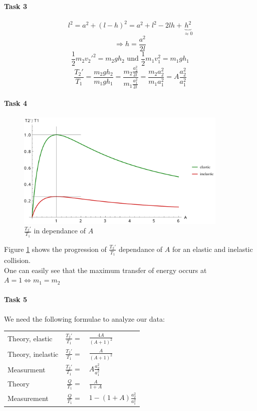 \documentclass{scrreprt}
\begin{document}
\paragraph*{Task 3}
\begin{equation}
l^2=a^2+(l-h)^2=a^2+l^2-2lh+\underbrace{h^2}_{\approx 0}
\end{equation}
\begin{equation}
\Rightarrow h=\frac{a^2}{2l}
\end{equation}
\begin{equation}
\frac{1}{2}m_2v_2'^2=m_2gh_2 \mbox{ und } \frac{1}{2}m_1v_1^2=m_1gh_1
\end{equation}
\begin{equation}
\frac{T_2'}{T_1}=\frac{m_2gh_2}{m_1gh_1}=\frac{m_2\frac{a_2^2}{2l}}{m_1\frac{a_1^2}{2l}}=\frac{m_2a_2^2}{m_1a_1^2}=A\frac{a_2^2}{a_1^2}
\end{equation}

\paragraph*{Task 4}
\begin{figure}[H]
	\centering
  \includegraphics[width=0.9\textwidth]{diag/collision.pdf}
	\caption{$\frac{T_2'}{T_1}$ in dependance of $A$}
	\label{fig:task4}
\end{figure}
\noindent Figure \ref{fig:task4} shows the progression of $\frac{T_2'}{T_1}$ dependance of $A$ for an elastic and inelastic collision.\\
One can easily see that the maximum transfer of energy occurs at $A=1\Leftrightarrow m_1=m_2$

\paragraph*{Task 5}
We need the following formulae to analyze our data:
\begin{center}
\begin{tabular}{lrl}
Theory, elastic & $\frac{T_2'}{T_1} = $ &  $\frac{4A}{(A+1)^2}$ \\
Theory, inelastic &$\frac{T_2'}{T_1} =$ &  $\frac{A}{(A+1)^2}$ \\
Measurment & $\frac{T_2'}{T_1} = $ & $A \frac{a_2^2}{a_1^2}$ \\
Theory & $\frac{Q}{T_1} = $ & $\frac{A}{1+A}$ \\
Measurement & $\frac{Q}{T_1} =$ & $1-(1+A)\frac{a_2^2}{a_1^2}$ \\
\end{tabular}
\end{center}
\end{document}
